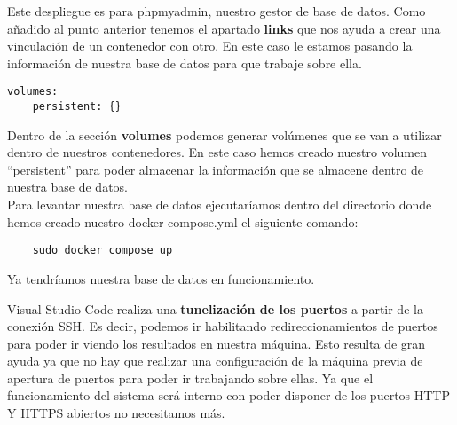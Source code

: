 Este despliegue es para phpmyadmin, nuestro gestor de base de datos. Como añadido al punto anterior tenemos el apartado \textbf{links} que nos ayuda a crear una vinculación de un contenedor con otro. En este caso le estamos pasando la información de nuestra base de datos para que trabaje sobre ella.
\begin{verbatim}
volumes:
    persistent: {}
\end{verbatim}
Dentro de la sección \textbf{volumes} podemos generar volúmenes que se van a utilizar dentro de nuestros contenedores. En este caso hemos creado nuestro volumen ``persistent'' para poder almacenar la información que se almacene dentro de nuestra base de datos.
\vspace{\baselineskip}
\\Para levantar nuestra base de datos ejecutaríamos dentro del directorio donde hemos creado nuestro docker-compose.yml el siguiente comando:
\begin{verbatim}
    sudo docker compose up
\end{verbatim}
Ya tendríamos nuestra base de datos en funcionamiento.
\vspace{\baselineskip}
\begin{tcolorbox}
    [colback=green!5!white,colframe=green!75!black,fonttitle=\bfseries,title=¿Cómo comprobamos los resultados?]
    Visual Studio Code realiza una \textbf{tunelización de los puertos} a partir de la conexión SSH. Es decir, podemos ir habilitando redireccionamientos de puertos para poder ir viendo los resultados en nuestra máquina. Esto resulta de gran ayuda ya que no hay que realizar una configuración de la máquina previa de apertura de puertos para poder ir trabajando sobre ellas. Ya que el funcionamiento del sistema será interno con poder disponer de los puertos HTTP Y HTTPS abiertos no necesitamos más.
\end{tcolorbox}

